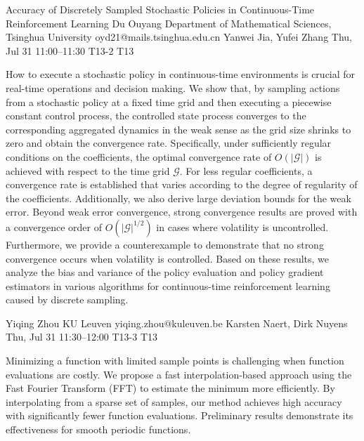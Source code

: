 \begin{talk}
  {Accuracy of Discretely Sampled Stochastic Policies in Continuous-Time Reinforcement Learning}%
  {Du Ouyang}%
  {Department of Mathematical Sciences, Tsinghua University}%
  {oyd21@mails.tsinghua.edu.cn}%
  {Yanwei Jia, Yufei Zhang}%
  {}%
  {Thu, Jul 31 11:00--11:30}%
  {T13-2}%
  {T13}%
  
    
   


\medskip

How to execute a stochastic policy in continuous-time environments is crucial for real-time operations and decision making. We show that, by sampling actions from a stochastic policy at a fixed time grid and then executing a piecewise constant control process, the controlled state process converges to the corresponding aggregated dynamics in the weak sense as the grid size shrinks to zero and obtain the convergence rate. Specifically, under sufficiently regular conditions on the coefficients, the optimal convergence rate of $O(|\mathscr{G}|)$ is achieved with respect to the time grid $\mathscr{G}$. For less regular coefficients, a convergence rate is established that varies according to the degree of regularity of the coefficients. Additionally, we also derive large deviation bounds for the weak error. Beyond weak error convergence, strong convergence results are proved with a convergence order of $O(|\mathscr{G}|^{1/2})$ in cases where volatility is uncontrolled. Furthermore, we provide a counterexample to demonstrate that no strong convergence occurs when volatility is controlled. Based on these results, we analyze the bias and variance of the policy evaluation and policy gradient estimators in various algorithms for continuous-time reinforcement learning caused by discrete sampling.


\end{talk}

\begin{talk}
  {Yiqing Zhou}%
  {KU Leuven}%
  {yiqing.zhou@kuleuven.be}%
  {Karsten Naert, Dirk Nuyens}%
  {}%
  {}%
  {Thu, Jul 31 11:30--12:00}%
  {T13-3}%
  {T13}%
  
    
   
Minimizing a function with limited sample points is challenging when function evaluations are costly. We propose a fast interpolation-based approach using the Fast Fourier Transform (FFT) to estimate the minimum more efficiently. By interpolating from a sparse set of samples, our method achieves high accuracy with significantly fewer function evaluations. Preliminary results demonstrate its effectiveness for smooth periodic functions.
\end{talk}


